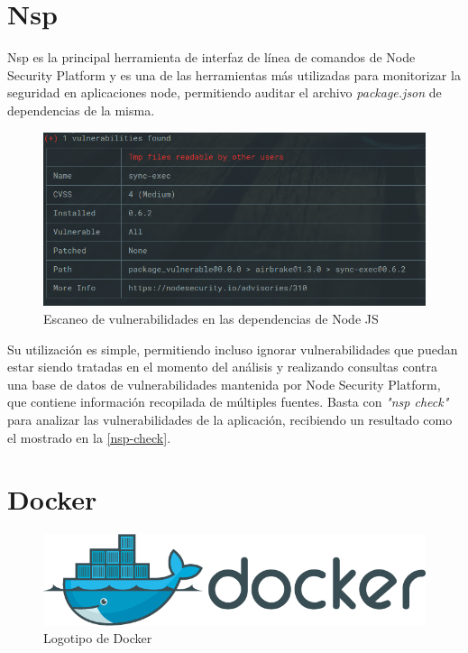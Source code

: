 \section{Nsp}

Nsp es la principal herramienta de interfaz de línea de comandos de Node Security Platform\cite{nodesp2017} y es una de las herramientas más utilizadas para monitorizar la seguridad en aplicaciones node, permitiendo auditar el archivo \textit{package.json} de dependencias de la misma.

\begin{figure}[htbp]
	\centering
	\includegraphics[width=0.80\linewidth]
	{entorno/figuras/nsp.png}
	\caption{Escaneo de vulnerabilidades en las dependencias de Node JS}
	\label{nsp-check}
\end{figure}

Su utilización es simple, permitiendo incluso ignorar vulnerabilidades que puedan estar siendo tratadas en el momento del análisis y realizando consultas contra una base de datos de vulnerabilidades mantenida por Node Security Platform, que contiene información recopilada de múltiples fuentes. Basta con \textit{"nsp check"} para analizar las vulnerabilidades de la aplicación, recibiendo un resultado como el mostrado en la \autoref{nsp-check}.


\section{Docker}

\begin{figure}[htbp]
	\centering
	\includegraphics[width=0.80\linewidth]
	{entorno/figuras/Docker.png}
	\caption{Logotipo de Docker}
	\label{docker-logo}
\end{figure}

